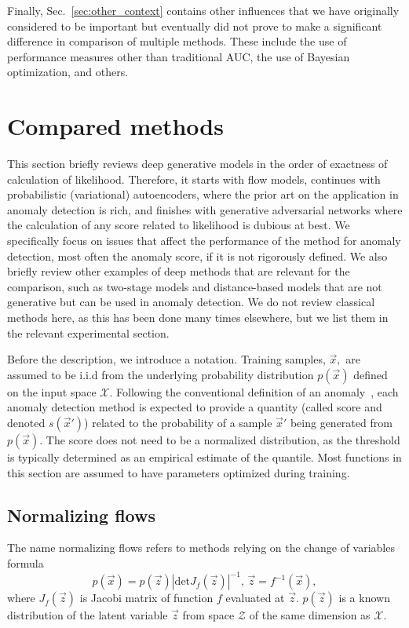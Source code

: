 Finally, Sec.~\ref{sec:other_context} contains other influences that we have originally considered to be important but eventually did not prove to make a significant difference in comparison of multiple methods. These include the use of performance measures other than traditional AUC, the use of Bayesian optimization, and others. 

\section{Compared methods}
\label{sec:comparedmethods}
This section briefly reviews deep generative models in the order of exactness of calculation of likelihood. Therefore, it starts with flow models, continues with probabilistic (variational) autoencoders, where the prior art on the application in anomaly detection is rich, and finishes with generative adversarial networks where the calculation of any score related to likelihood is dubious at best. We specifically focus on issues that affect the performance of the method for anomaly detection, most often the anomaly score, if it is not rigorously defined. We also briefly review other examples of deep methods that are relevant for the comparison, such as two-stage models and distance-based models that are not generative but can be used in anomaly detection. We do not review classical methods here, as this has been done many times elsewhere, but we list them in the relevant experimental section.

Before the description, we introduce a notation. Training samples, $\vec{x},$ are assumed to be i.i.d from the underlying probability distribution $p({\vec{x}})$ defined on the input space $\mathcal{X}$. Following the conventional definition of an anomaly~\cite{barnett1974outliers}, each anomaly detection method is expected to provide a quantity (called score and denoted $s(\vec{x}')$) related to the probability of a sample $\vec{x}'$ being generated from $p(\vec{x}).$ The score does not need to be a normalized distribution, as the threshold is typically determined as an empirical estimate of the quantile. Most functions in this section are assumed to have parameters optimized during training. 

\subsection{Normalizing flows}
The name normalizing flows refers to methods relying on the change of variables formula
\begin{equation}
    p\left(\vec{x}\right) = p\left(\vec{z}\right)\!\left\vert \text{det} J_f\!\left(\vec{z}\right) \right\vert^{-1}, \, \vec{z} = f^{-1}\!\left(\vec{x}\right),
\label{eq:rv_transformation}
\end{equation}
where $J_f\!\left(\vec{z}\right)$ is Jacobi matrix of function $f$ evaluated at $\vec{z}$. $p(\vec{z})$ is a known distribution of the latent variable $\vec{z}$ from space $\mathcal{Z}$ of the same dimension as $\mathcal{X}$.

